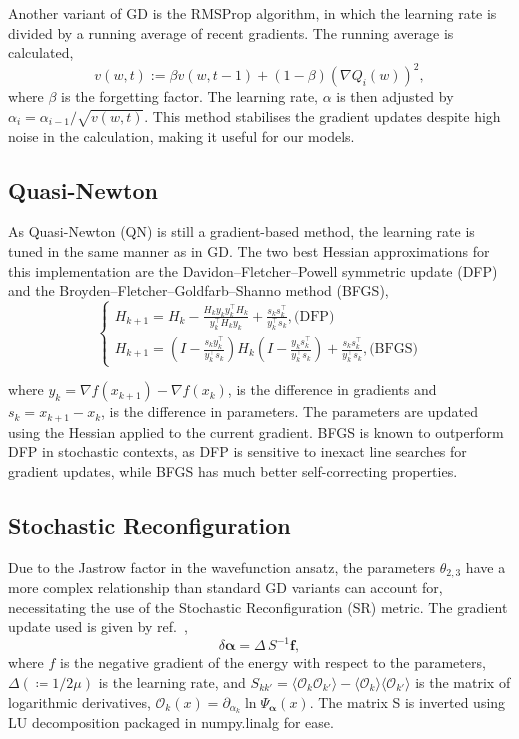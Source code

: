\documentclass[journal,12pt]{Imperial_lab_report}
\begin{document}
        Another variant of GD is the RMSProp algorithm, in which the learning rate is divided by a running average of recent gradients. The running average is calculated,
        \begin{equation*}
            v(w, t) := \beta v(w, t-1) + (1-\beta) (\nabla Q_i(w))^2,
        \end{equation*}
        where $\beta$ is the forgetting factor. The learning rate, $\alpha$ is then adjusted by $\alpha_i = \alpha_{i-1}/\sqrt{v(w,t)}$. This method stabilises the gradient updates despite high noise in the calculation, making it useful for our models. 

    \subsection{Quasi-Newton}
        As Quasi-Newton (QN) is still a gradient-based method, the learning rate is tuned in the same manner as in GD. The two best Hessian approximations for this implementation are the Davidon–Fletcher–Powell symmetric update (DFP) and the Broyden–Fletcher–Goldfarb–Shanno method (BFGS), 
        \begin{equation*}
            \begin{cases} 
                H_{k+1} = H_k - \frac{H_k y_k y_k^\top H_k}{y_k^\top H_k y_k} + \frac{s_k s_k^\top}{y_k^\top s_k}, \text{(DFP)} \\[10pt]
                H_{k+1} = \left(I - \frac{s_k y_k^\top}{y_k^\top s_k}\right) H_k \left(I - \frac{y_k s_k^\top}{y_k^\top s_k}\right) + \frac{s_k s_k^\top}{y_k^\top s_k},  \text{(BFGS)}
            \end{cases}
        \end{equation*}

        \noindent where $y_k = \nabla f(x_{k+1}) - \nabla f(x_k)$, is the difference in gradients and $s_k = x_{k+1} - x_k$, is the difference in parameters. The parameters are updated using the Hessian applied to the current gradient. BFGS is known to outperform DFP in stochastic contexts, as DFP is sensitive to inexact line searches for gradient updates, while BFGS has much better self-correcting properties. 
        
    \subsection{Stochastic Reconfiguration}
        Due to the Jastrow factor in the wavefunction ansatz, the parameters $\theta_{2,3}$ have a more complex relationship than standard GD variants can account for, necessitating the use of the Stochastic Reconfiguration (SR) metric. 
        The gradient update used is given by ref.~\cite{becca_2017_quantum}, 
        \[
        \delta\boldsymbol{\alpha} = \Delta\, S^{-1}\mathbf{f},
        \]
        where $f$ is the negative gradient of the energy with respect to the parameters, $\Delta (\coloneq 1/2\mu)$ is the learning rate, and $S_{kk'} = \langle \mathcal{O}_k \mathcal{O}_{k'} \rangle - \langle \mathcal{O}_k \rangle \langle \mathcal{O}_{k'} \rangle$ is the matrix of logarithmic derivatives, $\mathcal{O}_k(x) = \partial_{\alpha_k} \ln \Psi_{\boldsymbol{\alpha}}(x)$. The matrix S is inverted using LU decomposition packaged in numpy.linalg for ease.
\end{document}
